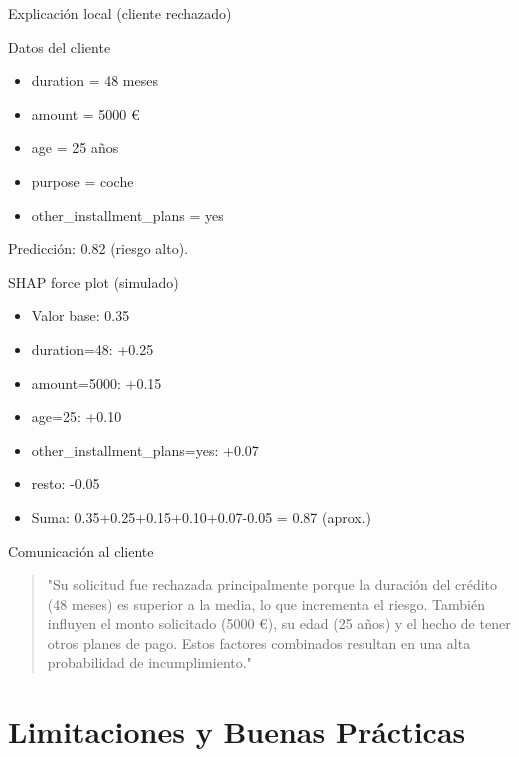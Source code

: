 \documentclass[aspectratio=169, 10pt, xcolor=table]{beamer}
\begin{document}
\begin{frame}{Explicación local (cliente rechazado)}
    \begin{block}{Datos del cliente}
        \begin{itemize}
            \item duration = 48 meses
            \item amount = 5000 €
            \item age = 25 años
            \item purpose = coche
            \item other_installment_plans = yes
        \end{itemize}
        Predicción: 0.82 (riesgo alto).
    \end{block}
    \begin{block}{SHAP force plot (simulado)}
        \begin{itemize}
            \item Valor base: 0.35
            \item duration=48: +0.25
            \item amount=5000: +0.15
            \item age=25: +0.10
            \item other_installment_plans=yes: +0.07
            \item resto: -0.05
            \item Suma: 0.35+0.25+0.15+0.10+0.07-0.05 = 0.87 (aprox.)
        \end{itemize}
    \end{block}
\end{frame}

\begin{frame}{Comunicación al cliente}
    \begin{quote}
        "Su solicitud fue rechazada principalmente porque la duración del crédito (48 meses) es superior a la media, lo que incrementa el riesgo. También influyen el monto solicitado (5000 €), su edad (25 años) y el hecho de tener otros planes de pago. Estos factores combinados resultan en una alta probabilidad de incumplimiento."
    \end{quote}
\end{frame}

\section{Limitaciones y Buenas Prácticas}
\end{document}
